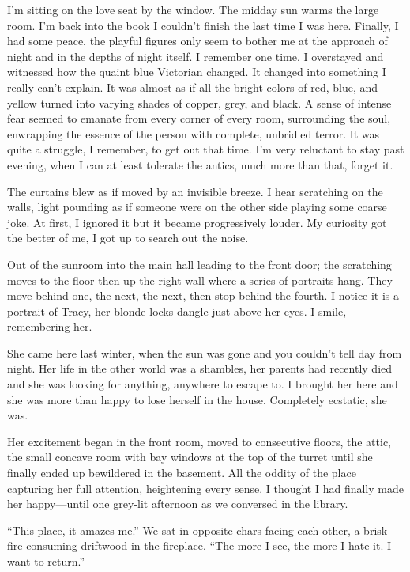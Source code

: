 I'm sitting on the love seat by the window. The midday sun warms the
large room. I'm back into the book I couldn't finish the last time I was
here. Finally, I had some peace, the playful figures only seem to bother
me at the approach of night and in the depths of night itself. I
remember one time, I overstayed and witnessed how the quaint blue
Victorian changed. It changed into something I really can't explain. It
was almost as if all the bright colors of red, blue, and yellow turned
into varying shades of copper, grey, and black. A sense of intense fear
seemed to emanate from every corner of every room, surrounding the soul,
enwrapping the essence of the person with complete, unbridled terror. It
was quite a struggle, I remember, to get out that time. I'm very
reluctant to stay past evening, when I can at least tolerate the antics,
much more than that, forget it.

The curtains blew as if moved by an invisible breeze. I hear scratching
on the walls, light pounding as if someone were on the other side
playing some coarse joke. At first, I ignored it but it became
progressively louder. My curiosity got the better of me, I got up to
search out the noise.

Out of the sunroom into the main hall leading to the front door; the
scratching moves to the floor then up the right wall where a series of
portraits hang. They move behind one, the next, the next, then stop
behind the fourth. I notice it is a portrait of Tracy, her blonde locks
dangle just above her eyes. I smile, remembering her.

She came here last winter, when the sun was gone and you couldn't tell
day from night. Her life in the other world was a shambles, her parents
had recently died and she was looking for anything, anywhere to escape
to. I brought her here and she was more than happy to lose herself in
the house. Completely ecstatic, she was.

Her excitement began in the front room, moved to consecutive floors, the
attic, the small concave room with bay windows at the top of the turret
until she finally ended up bewildered in the basement. All the oddity of
the place capturing her full attention, heightening every sense. I
thought I had finally made her happy---until one grey-lit afternoon as
we conversed in the library.

``This place, it amazes me.'' We sat in opposite chars facing each
other, a brisk fire consuming driftwood in the fireplace. ``The more I
see, the more I hate it. I want to return.''

